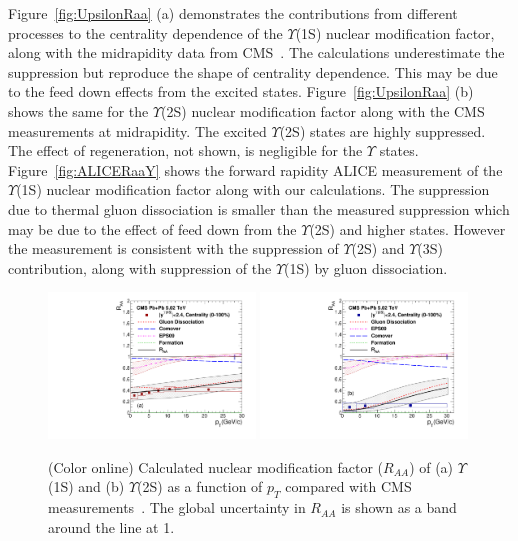 \documentclass[review]{elsarticle}
\begin{document}
{Figure~\ref{fig:UpsilonRaa} (a) demonstrates the contributions from different processes to the 
centrality dependence of the $\Upsilon$(1S) nuclear modification factor, along with the midrapidity 
data from CMS~\cite{Chatrchyan:2012lxa}. The calculations underestimate the suppression but reproduce 
the shape of centrality dependence. This may be due to the feed down effects from the excited states. 
Figure~\ref{fig:UpsilonRaa} (b) shows the same for the $\Upsilon$(2S) nuclear modification factor
along with the CMS measurements at midrapidity. The excited $\Upsilon$(2S) states 
are highly suppressed. The effect of regeneration, not shown, is negligible 
for the $\Upsilon$ states. 
{\color{black} Figure~\ref{fig:ALICERaaY} shows the forward rapidity 
  ALICE measurement of the $\Upsilon$(1S) nuclear modification factor \cite{Abelev:2014nua}
  along with our calculations. The suppression due to thermal gluon dissociation is smaller 
  than the measured suppression which may be due to the effect of feed down from the $\Upsilon$(2S)
  and higher states.} 
{\color{black} However the measurement is consistent with the suppression of $\Upsilon$(2S) and  
  $\Upsilon$(3S) contribution, along with suppression of the $\Upsilon$(1S) by gluon 
  dissociation.
}


\begin{figure}
\includegraphics[width=0.49\textwidth]{Figures/Quarkonia_502TeV/Fig7a_Y1S_CMS_RAAPt_Shade.pdf}
\includegraphics[width=0.49\textwidth]{Figures/Quarkonia_502TeV/Fig7b_Y2S_CMS_RAAPt_Shade.pdf}
\caption{(Color online) Calculated nuclear modification factor ($R_{AA}$) of (a) $\Upsilon$(1S) and 
  (b) $\Upsilon$(2S) as a function of $p_{T}$ 
  compared with CMS measurements~\cite{Sirunyan:2018nsz}.
The global uncertainty in $R_{AA}$ is shown as a band around the line at 1.
}
\label{fig:UpsilonRaaPtCMS}
\end{figure}



}
\end{document}
